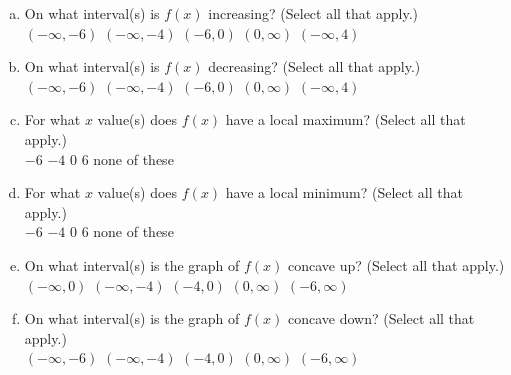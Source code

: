 \documentclass[fleqn,12pt]{article}
\newcommand{\<}{\ensuremath{\langle}}
\renewcommand{\>}{\ensuremath{\rangle}}
\begin{document}
\begin{enumerate}
\vskip12cm

  \begin{enumerate}[(a)]

\item 
On what interval(s) is $f(x)$ increasing? (Select all that apply.)\\[4pt]
\qedsymbol $(-\infty, -6)$ 
\hfill
\qedsymbol $(-\infty, -4)$
\hfill
\qedsymbol $(-6,0)$
\hfill
\qedsymbol $(0,\infty)$
\hfill
\qedsymbol $(-\infty, 4)$

\vskip5mm

\item 
On what interval(s) is $f(x)$ decreasing? (Select all that apply.)\\[4pt]
\qedsymbol $(-\infty, -6)$ 
\hfill
\qedsymbol $(-\infty, -4)$
\hfill
\qedsymbol $(-6,0)$
\hfill
\qedsymbol $(0,\infty)$
\hfill
\qedsymbol $(-\infty, 4)$


\vskip5mm

\item For what $x$ value(s) does $f(x)$ have a local maximum? (Select all that apply.)\\[4pt]
\qedsymbol $-6$
\hfill
\qedsymbol $-4$
\hfill
\qedsymbol $0$
\hfill
\qedsymbol $6$
\hfill
\qedsymbol none of these

\vskip5mm

\item For what $x$ value(s) does $f(x)$ have a local minimum? (Select all that apply.)\\[4pt]
\qedsymbol $-6$
\hfill
\qedsymbol $-4$
\hfill
\qedsymbol $0$
\hfill
\qedsymbol $6$
\hfill
\qedsymbol none of these

\vskip5mm

\item On what interval(s) is the graph of $f(x)$ concave up? (Select all that apply.)\\[4pt]
\qedsymbol $(-\infty, 0)$ 
\hfill
\qedsymbol $(-\infty, -4)$
\hfill
\qedsymbol $(-4,0)$
\hfill
\qedsymbol $(0,\infty)$
\hfill
\qedsymbol $(-6, \infty)$


\vskip5mm

\item On what interval(s) is the graph of $f(x)$ concave down? (Select all that apply.)\\[4pt]
\qedsymbol $(-\infty, -6)$ 
\hfill
\qedsymbol $(-\infty, -4)$
\hfill
\qedsymbol $(-4,0)$
\hfill
\qedsymbol $(0,\infty)$
\hfill
\qedsymbol $(-6, \infty)$



\end{enumerate}
\end{enumerate}
\end{document}
